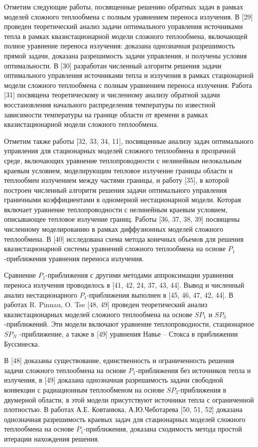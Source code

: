 Отметим следующие работы, посвященные решению обратных задач в
рамках моделей сложного теплообмена с полным уравнением переноса излучения.
В [29] проведен теоретический анализ задачи оптимального управления
источниками тепла в рамках квазистационарной модели сложного теплообмена, включающей полное уравнение
переноса излучения: доказана однозначная разрешимость прямой задачи,
доказана разрешимость задачи управления, и получены условия оптимальности.
В [30] разработан численный алгоритм решения задачи оптимального управления источниками тепла и излучения в рамках
стационарной модели сложного теплообмена с полным уравнением переноса излучения.
Работа [31] посвящена теоретическому и численному анализу обратной
задачи восстановления начального распределения температуры по известной
зависимости температуры на границе области от времени в рамках квазистационарной модели сложного теплообмена.


Отметим также работы [32, 33, 34, 11], посвященные анализу задач оптимального управления для стационарных
моделей сложного теплообмена в прозрачной среде, включающих уравнение теплопроводности с нелинейным
нелокальным краевым условием, моделирующим тепловое излучение границы
области и теплообмен излучением между частями границы, и работу [35], в которой построен численный
алгоритм решения задачи оптимального управления граничными коэффициентами в одномерной нестационарной модели.
Которая включает уравнение теплопроводности с нелинейным краевым условием, описывающее тепловое излучение границ.
Работы [36, 37, 38, 39] посвящены численному моделированию в рамках диффузионных моделей сложного теплообмена.
В [40] исследована схема метода конечных объемов для решения квазистационарной системы
уравнений сложного теплообмена на основе $P_1$-приближения уравнения переноса излучения.


Сравнение $P_1$-приближения с другими методами аппроксимации уравнения переноса излучения проводилось
в [41, 42, 24, 37, 43, 44].
Вывод и численный анализ нестационарного $P_1$-приближения выполнен в [45, 46, 47, 42, 44].
В работах R. Pinnau, O. Tse [48, 49] проведен теоретический
анализ квазистационарных моделей сложного теплообмена на основе $SP_1$ и $SP_3$-приближений.
Эти модели включают уравнение теплопроводности, стационарное $SP_N$ -приближение,
а также в [49] уравнения Навье – Стокса в приближении Буссинеска.


В [48] доказаны существование, единственность и ограниченность решения задачи сложного
теплообмена на основе $P_1$-приближения без источников
тепла и излучения, в [49] доказана однозначная разрешимость задачи свободной
конвекции с радиационным теплообменом на основе $SP_3$-приближения в двумерной области,
в этой модели присутствуют источники тепла с ограниченной плотностью.
В работах А.Е. Ковтанюка, А.Ю.Чеботарева [50, 51, 52] доказана
однозначная разрешимость краевых задач для стационарных моделей сложного теплообмена
на основе $P_1$-приближения, доказана сходимость метода простой итерации нахождения решения.


